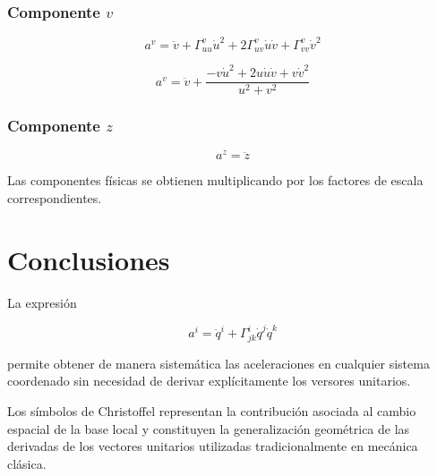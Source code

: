 \documentclass[12pt]{article}
\begin{document}
\subsubsection*{Componente \(v\)}

\[
a^v=
\ddot v
+
\Gamma^v_{uu}\dot u^2
+
2\Gamma^v_{uv}\dot u\dot v
+
\Gamma^v_{vv}\dot v^2
\]

\[
\boxed{
a^v=
\ddot v
+
\frac{
-v\dot u^2
+
2u\dot u\dot v
+
v\dot v^2
}
{u^2+v^2}
}
\]

\subsubsection*{Componente \(z\)}

\[
a^z=\ddot z
\]

Las componentes físicas se obtienen multiplicando por los factores de escala correspondientes.


\section{Conclusiones}

La expresión

\[
a^i=
\ddot q^i+
\Gamma^i_{jk}
\dot q^j
\dot q^k
\]

permite obtener de manera sistemática las aceleraciones en cualquier sistema coordenado sin necesidad de derivar explícitamente los versores unitarios.

Los símbolos de Christoffel representan la contribución asociada al cambio espacial de la base local y constituyen la generalización geométrica de las derivadas de los vectores unitarios utilizadas tradicionalmente en mecánica clásica.
\end{document}
